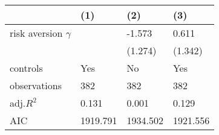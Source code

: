 \begin{tabular}{llll}
\hline
 & (1) & (2) & (3) \\
\hline
risk aversion  $\gamma$ &  & -1.573 & 0.611 \\
 &  & (1.274) & (1.342) \\
controls & Yes & No & Yes \\
observations & 382 & 382 & 382 \\
adj.$R^2$ & 0.131 & 0.001 & 0.129 \\
AIC & 1919.791 & 1934.502 & 1921.556 \\
\hline
\end{tabular}
